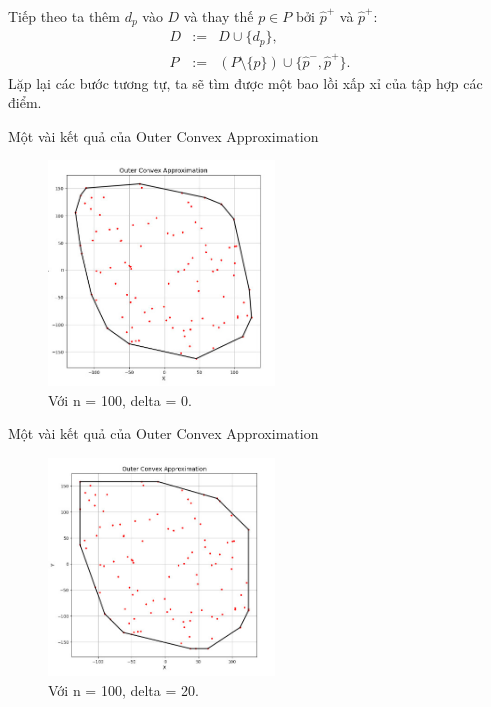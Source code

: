 \documentclass[11pt]{beamer}
\theoremstyle{definition}
\theoremstyle{plain}
\theoremstyle{plain}
\theoremstyle{remark}
\begin{document}
\begin{frame}
	Tiếp theo ta thêm $d_p$ vào $D$ và thay thế $p \in P$ bởi $\hat p^+$ và $\hat p^+$:
	\begin{equation}\label{newDP1}
		\begin{array}{lcl}
			D &:=& D \cup \{d_{p}\}, \\
			P &:=&(P \setminus \{p\}) \cup \{\hat p^-, \hat p^+\}.
		\end{array}
	\end{equation}
	Lặp lại các bước tương tự, ta sẽ tìm được một bao lồi xấp xỉ của tập hợp các điểm.
\end{frame}

\begin{frame}{Một vài kết quả của Outer Convex Approximation}
		\begin{figure}
			\begin{center}
				\includegraphics[width=6cm]{./result_outer_cv_delta0.jpg}
				\caption{Với n = 100, delta = 0.}
				\label{result_outer_cv_delta0}
			\end{center}
		\end{figure}
		
\end{frame}
\begin{frame}{Một vài kết quả của Outer Convex Approximation}
	\begin{figure}
		\begin{center}
			\includegraphics[width=6cm]{./result_outer_cv_delta20.jpg}
			\caption{Với n = 100, delta = 20.}
			\label{result_outer_cv_delta20}
		\end{center}
	\end{figure}
	
\end{frame}
\end{document}
